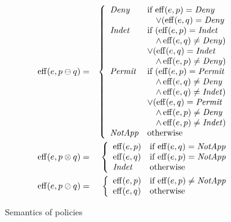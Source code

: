 \begin{figure}[t]
\begin{footnotesize}
\begin{eqnarray*}
  \operatorname{eff} (e, p \ominus q) & = & \left\{\begin{array}{ll}
  \text{\textit{Deny}} & \text{if $\operatorname{eff}(e, p) = \text{\textit{Deny}}$} \\
  & \text{$\quad \vee (\operatorname{eff}(e, q) = \text{\textit{Deny}}$} \\
  \text{\textit{Indet}} & \text{if } (\operatorname{eff}(e, p) = \text{\textit{Indet}} \\
  & \quad \wedge \operatorname{eff}(e, q) \neq \text{\textit{Deny}}) \\
  & \vee (\operatorname{eff}(e, q) = \text{\textit{Indet}} \\
  & \quad \wedge \operatorname{eff}(e, p) \neq \text{\textit{Deny}}) \\
  \text{\textit{Permit}} & \text{if } (\operatorname{eff}(e, p) = \text{\textit{Permit}} \\
  & \quad \wedge \operatorname{eff}(e, q) \neq \text{\textit{Deny}} \\
  & \quad \wedge \operatorname{eff}(e, q) \neq \text{\textit{Indet}}) \\
  & \vee (\operatorname{eff}(e, q) = \text{\textit{Permit}} \\
  & \quad \wedge \operatorname{eff}(e, p) \neq \text{\textit{Deny}} \\
  & \quad \wedge \operatorname{eff}(e, p)\neq \text{\textit{Indet}}) \\
  \text{\textit{NotApp}} & \text{otherwise}
  \end{array}\right. \\
  \operatorname{eff} (e, p \otimes q) & = & \left\{\begin{array}{ll}
  \operatorname{eff} (e, p) & \text{if $\operatorname{eff}(e, q) = \text{\textit{NotApp}}$} \\
  \operatorname{eff} (e, q) & \text{if $\operatorname{eff}(e, p) = \text{\textit{NotApp}}$} \\
  \text{\textit{Indet}} & \text{otherwise}
  \end{array}\right. \\
  \operatorname{eff} (e, p \oslash q) & = & \left\{\begin{array}{ll}
  \operatorname{eff} (e, p) & \text{if $\operatorname{eff}(e, p) \neq \text{\textit{NotApp}}$} \\
  \operatorname{eff} (e, q) & \text{otherwise}
  \end{array}\right.
\end{eqnarray*}
\end{footnotesize}
\caption{Semantics of policies}
\label{fig:semantics}
\end{figure}


